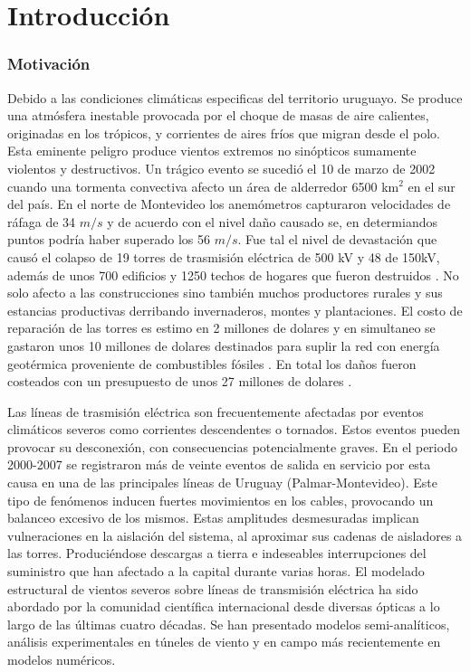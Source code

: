 \chapter{Introducción}
 
\subsection{Motivación}
\linenumbers


Debido a las condiciones climáticas especificas del territorio uruguayo. Se produce una atmósfera inestable provocada por el choque de masas de aire calientes, originadas en los trópicos, y corrientes de aires fríos que migran desde el polo. Esta eminente peligro produce vientos extremos no sinópticos sumamente violentos y destructivos. Un trágico evento se sucedió el 10 de marzo de 2002 cuando una tormenta convectiva afecto un área de alderredor 6500 km$^2$ en el sur del país\cite{DNM2002}. En el norte de Montevideo los anemómetros capturaron velocidades de ráfaga de 34 $m/s$ y de acuerdo con el nivel daño causado se, en determiandos puntos podría haber superado los 56 $m/s$. Fue tal el nivel de devastación que causó el colapso de 19 torres de trasmisión eléctrica de 500 kV y 48 de 150kV, además de unos 700 edificios y 1250 techos de hogares que fueron destruidos \citep{duranona2015significance}. No solo afecto a las construcciones sino también muchos productores rurales y sus estancias productivas derribando invernaderos, montes y plantaciones. El costo de reparación de las torres es estimo en 2 millones de dolares y en simultaneo se gastaron unos 10 millones de dolares destinados para suplir la red con energía geotérmica proveniente de combustibles fósiles . En total los daños fueron costeados con un presupuesto de unos 27 millones de dolares \cite{duranona2019first}.

Las líneas de trasmisión eléctrica son frecuentemente afectadas por eventos climáticos severos como corrientes descendentes o tornados. Estos eventos pueden provocar su desconexión, con consecuencias potencialmente graves. En el periodo 2000-2007 se registraron más de veinte eventos de salida en servicio por esta causa en una de las principales líneas de Uruguay (Palmar-Montevideo). Este tipo de fenómenos inducen fuertes movimientos en los cables, provocando un balanceo excesivo de los mismos. Estas amplitudes desmesuradas implican vulneraciones en la aislación del sistema, al aproximar sus cadenas de aisladores a las torres. Produciéndose descargas a tierra e indeseables interrupciones del suministro que han afectado a la capital durante varias horas. El modelado estructural de vientos severos sobre líneas de transmisión eléctrica ha sido abordado por la comunidad científica internacional desde diversas ópticas a lo largo de las últimas cuatro décadas. Se han presentado modelos semi-analíticos, análisis experimentales en túneles de viento y en campo más recientemente en modelos numéricos.
 
